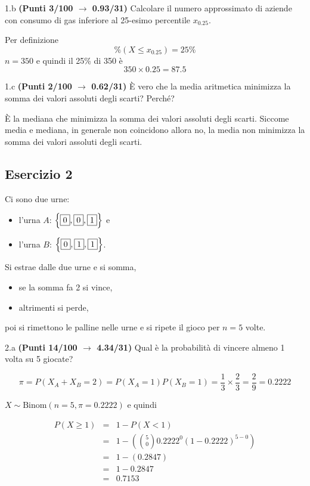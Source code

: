 \documentclass[
  11pt,
]{book}
\providecommand{\tightlist}{%
  \setlength{\itemsep}{0pt}\setlength{\parskip}{0pt}}
\theoremstyle{mytheoremstyle}
\theoremstyle{mydefstyle}
\newenvironment{sol}
  {
  \begin{tcolorbox}[enhanced,breakable,arc=0.1mm,boxrule=1pt,colback=white,colframe=iblue,
  title=\bf \fontfamily{lmss}\selectfont \hspace{.5 cm} Soluzione,drop fuzzy shadow]

}{
\end{tcolorbox}
  }
\begin{document}
1.b \textbf{(Punti 3/100 \(\rightarrow\) 0.93/31)} Calcolare il numero approssimato di aziende con consumo di gas inferiore al 25-esimo percentile \(x_{0.25}\).

\begin{sol}
Per definizione
\[
\%(X\le x_{0.25})=25\%
\]
\(n=350\) e quindi il 25\% di 350 è
\[
350\times0.25=87.5
\]

\end{sol}

1.c \textbf{(Punti 2/100 \(\rightarrow\) 0.62/31)} È vero che la media aritmetica minimizza la somma dei valori assoluti degli scarti? Perché?

\begin{sol}
È la mediana che minimizza la somma dei valori assoluti degli scarti. Siccome media e mediana, in generale non coincidono allora no, la media non minimizza la somma dei valori assoluti degli scarti.

\end{sol}

\subsection{Esercizio 2}\label{esercizio-2-9}

Ci sono due urne:

\begin{itemize}
\tightlist
\item
  l'urna \(A\): \(\left\{\fbox{0},\fbox{0},\fbox{1}\right\}\) e
\item
  l'urna \(B\): \(\left\{\fbox{0},\fbox{1},\fbox{1}\right\}\).
\end{itemize}

Si estrae dalle due urne e si somma,

\begin{itemize}
\tightlist
\item
  se la somma fa 2 si vince,
\item
  altrimenti si perde,
\end{itemize}

poi si rimettono le palline nelle urne e si ripete il gioco per \(n=5\) volte.

2.a \textbf{(Punti 14/100 \(\rightarrow\) 4.34/31)} Qual è la probabilità di vincere almeno 1 volta su 5 giocate?

\begin{sol}
\[
\pi=P(X_A+X_B=2)=P(X_A=1)P(X_B=1)=\frac 13\times\frac23=\frac29=0.2222
\]

\(X\sim\text{Binom}(n=5,\pi=0.2222)\) e quindi

\normalsize 
\begin{eqnarray*}
      P( X \geq 1 ) &=& 1-P( X < 1 ) \\                 &=& 1-\left( \binom{ 5 }{ 0 } 0.2222 ^{ 0 }(1- 0.2222 )^{ 5 - 0 } \right)\\                 &=& 1-( 0.2847 )\\                 &=& 1- 0.2847 \\                 &=&   0.7153 
   \end{eqnarray*}
\normalsize 

\end{sol}
\end{document}
